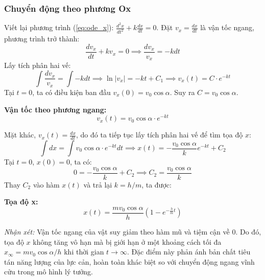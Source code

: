 \subsubsection{Chuyển động theo phương Ox}
Viết lại phương trình (\ref{eq:ode_x}): $\frac{d^2x}{dt^2} + k\frac{dx}{dt} = 0$. Đặt $v_x = \frac{dx}{dt}$ là vận tốc ngang, phương trình trở thành:
\begin{equation*}
\frac{dv_x}{dt} + kv_x = 0 \implies \frac{dv_x}{v_x} = -k dt
\end{equation*}
Lấy tích phân hai vế:
\begin{equation*}
\int \frac{dv_x}{v_x} = \int -k dt \implies \ln|v_x| = -kt + C_1 \implies v_x(t) = C \cdot e^{-kt}
\end{equation*}
Tại $t = 0$, ta có điều kiện ban đầu $v_x(0) = v_0\cos\alpha$. Suy ra $C = v_0\cos\alpha$.

\textbf{Vận tốc theo phương ngang:}
\begin{equation}
v_x(t) = v_0 \cos\alpha \cdot e^{-kt}
\label{eq:vx}
\end{equation}

Mặt khác, $v_x(t) = \frac{dx}{dt}$, do đó ta tiếp tục lấy tích phân hai vế để tìm tọa độ $x$:
\begin{equation*}
\int dx = \int v_0 \cos\alpha \cdot e^{-kt} dt \implies x(t) = -\frac{v_0 \cos\alpha}{k} e^{-kt} + C_2
\end{equation*}
Tại $t = 0$, $x(0) = 0$, ta có:
\begin{equation*}
0 = -\frac{v_0 \cos\alpha}{k} + C_2 \implies C_2 = \frac{v_0 \cos\alpha}{k}
\end{equation*}
Thay $C_2$ vào hàm $x(t)$ và trả lại $k = h/m$, ta được:

\textbf{Tọa độ x:}
\begin{equation}
x(t) = \frac{m v_0 \cos\alpha}{h}\left(1 - e^{-\frac{h}{m}t}\right)
\label{eq:x}
\end{equation}

\textit{Nhận xét:} Vận tốc ngang của vật suy giảm theo hàm mũ và tiệm cận về 0. Do đó, tọa độ $x$ không tăng vô hạn mà bị giới hạn ở một khoảng cách tối đa $x_\infty = mv_0\cos\alpha/h$ khi thời gian $t \to \infty$. Đặc điểm này phản ánh bản chất tiêu tán năng lượng của lực cản, hoàn toàn khác biệt so với chuyển động ngang vĩnh cửu trong mô hình lý tưởng.


